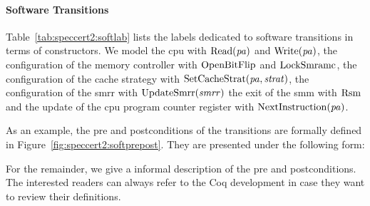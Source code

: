 \paragraph{Software Transitions}
%
Table~\ref{tab:speccert2:softlab} lists the labels dedicated to software
transitions in terms of constructors.
%
We model the \ac{cpu} \IOs with \( \func{Read}(\var{pa}) \) and
\( \func{Write}(\var{pa}) \), the configuration of the memory controller with
\( \func{OpenBitFlip} \) and \( \func{LockSmramc} \), the configuration of the
cache strategy with \( \func{SetCacheStrat}(\var{pa}, \var{strat}) \), the
configuration of the \ac{smrr} with \( \func{UpdateSmrr}(\var{smrr}) \) the exit
of the \ac{smm} with $\func{Rsm}$ and the update of the \ac{cpu} program counter
register with $\func{NextInstruction}(\var{pa})$.

As an example, the pre and postconditions of the  transitions are
formally defined in Figure~\ref{fig:speccert2:softprepost}.
%
They are presented under the following form:
%
\begin{prooftree}
\end{prooftree}
%
For the remainder, we give a informal description of the pre and postconditions.
%
The interested readers can always refer to the Coq development in case they want
to review their definitions.


